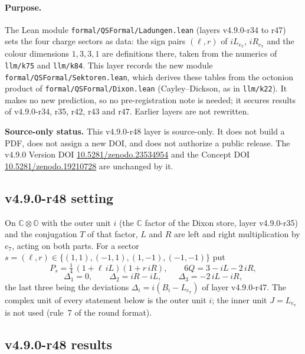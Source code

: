 \paragraph{Purpose.}
The Lean module \texttt{formal/QSFormal/Ladungen.lean} (layers v4.9.0-r34 to r47) sets the four charge sectors as data: the sign pairs
\((\ell,r)\) of \(iL_{e_7}\), \(iR_{e_7}\) and the colour dimensions \(1,3,3,1\) are definitions there, taken from the numerics of
\texttt{llm/k75} and \texttt{llm/k84}.  This layer records the new module \texttt{formal/QSFormal/Sektoren.lean}, which derives these tables
from the octonion product of \texttt{formal/QSFormal/Dixon.lean} (Cayley--Dickson, as in \texttt{llm/k22}).  It makes no new prediction,
so no pre-registration note is needed; it secures results of v4.9.0-r34, r35, r42, r43 and r47.  Earlier layers are not rewritten.

\noindent\textbf{Source-only status.}
This v4.9.0-r48 layer is source-only.  It does not build a PDF, does not assign a new DOI,
and does not authorize a public release.  The v4.9.0 Version DOI
\href{https://doi.org/10.5281/zenodo.23534954}{10.5281/zenodo.23534954} and the Concept DOI
\href{https://doi.org/10.5281/zenodo.19210728}{10.5281/zenodo.19210728} are unchanged by it.

\subsection*{v4.9.0-r48 setting}
\label{subsec:v490-r48-setting}

On \(\mathbb C\otimes\mathbb O\) with the outer unit \(i\) (the \(\mathbb C\) factor of the Dixon store, layer v4.9.0-r35) and the
conjugation \(T\) of that factor, \(L\) and \(R\) are left and right multiplication by \(e_7\), acting on both parts.  For a sector
\(s=(\ell,r)\in\{(1,1),(-1,1),(1,-1),(-1,-1)\}\) put
\[
P_s=\tfrac14\,(1+\ell\, iL)(1+r\, iR),\qquad 6Q=3-iL-2\,iR,
\]
\[
\Delta_1=0,\qquad \Delta_2=iR-iL,\qquad \Delta_3=-2\,iL-iR,
\]
the last three being the deviations \(\Delta_i=i(B_i-L_{e_7})\) of layer v4.9.0-r47.  The complex unit of every statement below is the outer
unit \(i\); the inner unit \(J=L_{e_7}\) is not used (rule~7 of the round format).

\subsection*{v4.9.0-r48 results}
\label{subsec:v490-r48-results}


